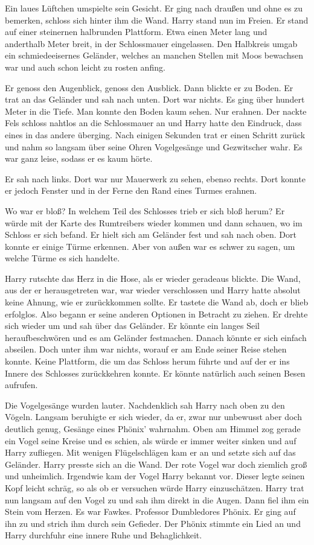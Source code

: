 Ein laues Lüftchen umspielte sein Gesicht. Er ging nach draußen und ohne es zu bemerken, schloss sich hinter ihm die Wand. Harry stand nun im Freien. Er stand auf einer steinernen halbrunden Plattform. Etwa einen Meter lang und anderthalb Meter breit, in der Schlossmauer eingelassen. Den Halbkreis umgab ein schmiedeeisernes Geländer, welches an manchen Stellen mit Moos bewachsen war und auch schon leicht zu rosten anfing.

Er genoss den Augenblick, genoss den Ausblick. Dann blickte er zu Boden. Er trat an das Geländer und sah nach unten. Dort war nichts. Es ging über hundert Meter in die Tiefe. Man konnte den Boden kaum sehen. Nur erahnen. Der nackte Fels schloss nahtlos an die Schlossmauer an und Harry hatte den Eindruck, dass eines in das andere überging. Nach einigen Sekunden trat er einen Schritt zurück und nahm so langsam über seine Ohren Vogelgesänge und Gezwitscher wahr. Es war ganz leise, sodass er es kaum hörte.

Er sah nach links. Dort war nur Mauerwerk zu sehen, ebenso rechts. Dort konnte er jedoch Fenster und in der Ferne den Rand eines Turmes erahnen.

Wo war er bloß? In welchem Teil des Schlosses trieb er sich bloß herum? Er würde mit der Karte des Rumtreibers wieder kommen und dann schauen, wo im Schloss er sich befand. Er hielt sich am Geländer fest und sah nach oben. Dort konnte er einige Türme erkennen. Aber von außen war es schwer zu sagen, um welche Türme es sich handelte.

Harry rutschte das Herz in die Hose, als er wieder geradeaus blickte. Die Wand, aus der er herausgetreten war, war wieder verschlossen und Harry hatte absolut keine Ahnung, wie er zurückkommen sollte. Er tastete die Wand ab, doch er blieb erfolglos. Also begann er seine anderen Optionen in Betracht zu ziehen. Er drehte sich wieder um und sah über das Geländer. Er könnte ein langes Seil heraufbeschwören und es am Geländer festmachen. Danach könnte er sich einfach abseilen. Doch unter ihm war nichts, worauf er am Ende seiner Reise stehen konnte. Keine Plattform, die um das Schloss herum führte und auf der er ins Innere des Schlosses zurückkehren konnte. Er könnte natürlich auch seinen Besen aufrufen.

Die Vogelgesänge wurden lauter. Nachdenklich sah Harry nach oben zu den Vögeln. Langsam beruhigte er sich wieder, da er, zwar nur unbewusst aber doch deutlich genug, Gesänge eines Phönix' wahrnahm. Oben am Himmel zog gerade ein Vogel seine Kreise und es schien, als würde er immer weiter sinken und auf Harry zufliegen. Mit wenigen Flügelschlägen kam er an und setzte sich auf das Geländer. Harry presste sich an die Wand. Der rote Vogel war doch ziemlich groß und unheimlich. Irgendwie kam der Vogel Harry bekannt vor. Dieser legte seinen Kopf leicht schräg, so als ob er versuchen würde Harry einzuschätzen. Harry trat nun langsam auf den Vogel zu und sah ihm direkt in die Augen. Dann fiel ihm ein Stein vom Herzen. Es war Fawkes. Professor Dumbledores Phönix. Er ging auf ihn zu und strich ihm durch sein Gefieder. Der Phönix stimmte ein Lied an und Harry durchfuhr eine innere Ruhe und Behaglichkeit.

